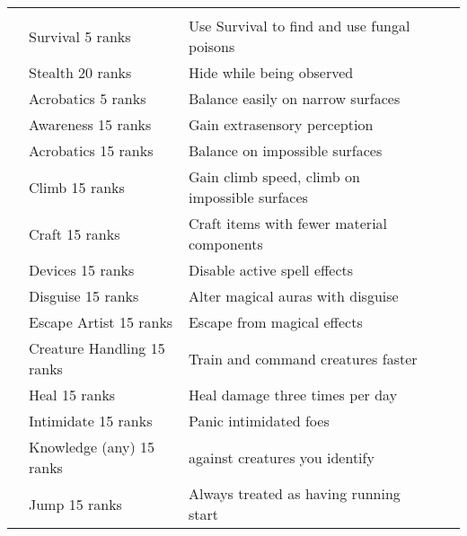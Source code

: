 \begin{longtabuwrapper}
\begin{longtabu}{>{\lcol}p{10em} >{\lcol}p{15em} >{\lcol}X >{\lcol}p{8em} >{\lcol}p{3em}}
        \midrule
         &  &  &  &  \\
         & Survival 5 ranks & Use Survival to find and use fungal poisons & \x &  \\
         & Stealth 20 ranks & Hide while being observed & \x &  \\
         & Acrobatics 5 ranks & Balance easily on narrow surfaces & \x &  \\
         & Awareness 15 ranks & Gain extrasensory perception & \x &  \\
         & Acrobatics 15 ranks & Balance on impossible surfaces & \x &  \\
         & Climb 15 ranks & Gain climb speed, climb on impossible surfaces & \x &  \\
         & Craft 15 ranks & Craft items with fewer material components & \x &  \\
         & Devices 15 ranks & Disable active spell effects & \x &  \\
         & Disguise 15 ranks & Alter magical auras with disguise & \x &  \\
         & Escape Artist 15 ranks & Escape from magical effects & \x &  \\
         & Creature Handling 15 ranks & Train and command creatures faster & \x &  \\
         & Heal 15 ranks & Heal damage three times per day & \x &  \\
         & Intimidate 15 ranks & Panic intimidated foes & \x &  \\
         & Knowledge (any) 15 ranks &  against creatures you identify & \x &  \\
         & Jump 15 ranks & Always treated as having running start & \x &  \\

\end{longtabu}
\end{longtabuwrapper}
